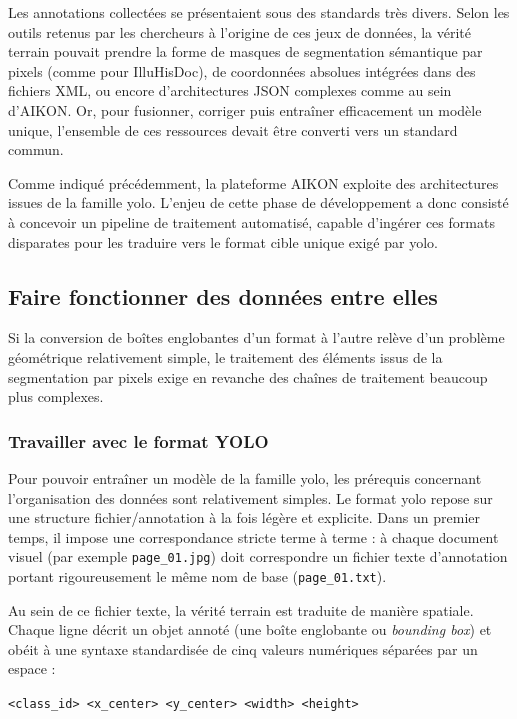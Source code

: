 Les annotations collectées se présentaient sous des standards très divers. Selon les outils retenus par les chercheurs à l'origine de ces jeux de données, la vérité terrain pouvait prendre la forme de masques de segmentation sémantique par pixels (comme pour IlluHisDoc), de coordonnées absolues intégrées dans des fichiers XML, ou encore d'architectures JSON complexes comme au sein d'AIKON. Or, pour fusionner, corriger puis entraîner efficacement un modèle unique, l'ensemble de ces ressources devait être converti vers un standard commun.

Comme indiqué précédemment, la plateforme AIKON exploite des architectures issues de la famille \gls{yolo}. L'enjeu de cette phase de développement a donc consisté à concevoir un pipeline de traitement automatisé, capable d'ingérer ces formats disparates pour les traduire vers le format cible unique exigé par \gls{yolo}.

\subsection{Faire fonctionner des données entre elles}

Si la conversion de boîtes englobantes d'un format à l'autre relève d'un problème géométrique relativement simple, le traitement des éléments issus de la segmentation par pixels exige en revanche des chaînes de traitement beaucoup plus complexes.

\subsubsection{Travailler avec le format YOLO}

Pour pouvoir entraîner un modèle de la famille \gls{yolo}, les prérequis concernant l'organisation des données sont relativement simples. Le format \gls{yolo} repose sur une structure fichier/annotation à la fois légère et explicite. Dans un premier temps, il impose une correspondance stricte terme à terme : à chaque document visuel (par exemple \texttt{page\_01.jpg}) doit correspondre un fichier texte d'annotation portant rigoureusement le même nom de base (\texttt{page\_01.txt}).

Au sein de ce fichier texte, la vérité terrain est traduite de manière spatiale. Chaque ligne décrit un objet annoté (une boîte englobante ou \textit{bounding box}) et obéit à une syntaxe standardisée de cinq valeurs numériques séparées par un espace :
\begin{center}
	\texttt{<class\_id> <x\_center> <y\_center> <width> <height>}
\end{center}

